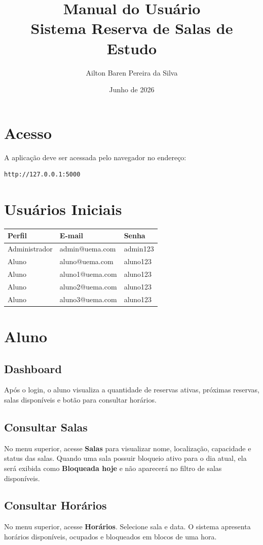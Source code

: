 \documentclass[12pt,a4paper]{article}
\title{\textbf{Manual do Usuário}\\Sistema Reserva de Salas de Estudo}
\author{Ailton Baren Pereira da Silva}
\date{Junho de 2026}
\begin{document}
\maketitle

\section{Acesso}
A aplicação deve ser acessada pelo navegador no endereço:
\begin{verbatim}
http://127.0.0.1:5000
\end{verbatim}

\section{Usuários Iniciais}
\begin{longtable}{|p{4cm}|p{6cm}|p{4cm}|}
\hline
\textbf{Perfil} & \textbf{E-mail} & \textbf{Senha} \\ \hline
Administrador & admin@uema.com & admin123 \\ \hline
Aluno & aluno@uema.com & aluno123 \\ \hline
Aluno & aluno1@uema.com & aluno123 \\ \hline
Aluno & aluno2@uema.com & aluno123 \\ \hline
Aluno & aluno3@uema.com & aluno123 \\ \hline
\end{longtable}

\section{Aluno}
\subsection{Dashboard}
Após o login, o aluno visualiza a quantidade de reservas ativas, próximas reservas, salas disponíveis e botão para consultar horários.

\subsection{Consultar Salas}
No menu superior, acesse \textbf{Salas} para visualizar nome, localização, capacidade e status das salas. Quando uma sala possuir bloqueio ativo para o dia atual, ela será exibida como \textbf{Bloqueada hoje} e não aparecerá no filtro de salas disponíveis.

\subsection{Consultar Horários}
No menu superior, acesse \textbf{Horários}. Selecione sala e data. O sistema apresenta horários disponíveis, ocupados e bloqueados em blocos de uma hora.
\end{document}
